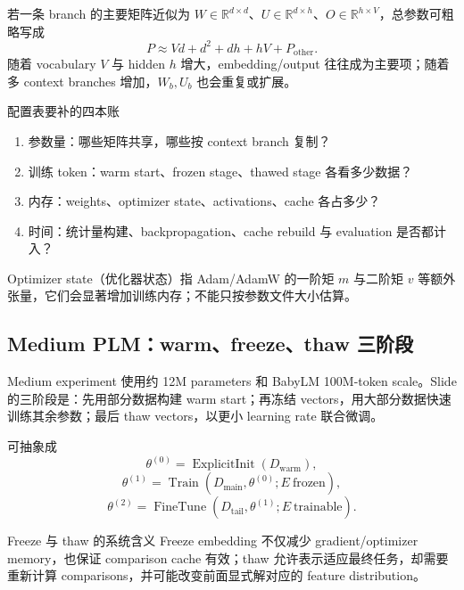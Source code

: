 
若一条 branch 的主要矩阵近似为 $W\in\mathbb{R}^{d\times d}$、$U\in\mathbb{R}^{d\times h}$、$O\in\mathbb{R}^{h\times V}$，总参数可粗略写成
\[
P\approx Vd+d^2+dh+hV+P_{\text{other}}.
\]
随着 vocabulary $V$ 与 hidden $h$ 增大，embedding/output 往往成为主要项；随着多 context branches 增加，$W_b,U_b$ 也会重复或扩展。

\begin{knowledgebox}{配置表要补的四本账}
\begin{enumerate}
  \item 参数量：哪些矩阵共享，哪些按 context branch 复制？
  \item 训练 token：warm start、frozen stage、thawed stage 各看多少数据？
  \item 内存：weights、optimizer state、activations、cache 各占多少？
  \item 时间：统计量构建、backpropagation、cache rebuild 与 evaluation 是否都计入？
\end{enumerate}
Optimizer state（优化器状态）指 Adam/AdamW 的一阶矩 $m$ 与二阶矩 $v$ 等额外张量，它们会显著增加训练内存；不能只按参数文件大小估算。
\end{knowledgebox}

\subsection{Medium PLM：warm、freeze、thaw 三阶段}

Medium experiment 使用约 12M parameters 和 BabyLM 100M-token scale。Slide 的三阶段是：先用部分数据构建 warm start；再冻结 vectors，用大部分数据快速训练其余参数；最后 thaw vectors，以更小 learning rate 联合微调。


可抽象成
\[
\theta^{(0)}=\operatorname{ExplicitInit}(D_{\text{warm}}),
\]
\[
\theta^{(1)}=\operatorname{Train}(D_{\text{main}},\theta^{(0)};E\ \text{frozen}),
\]
\[
\theta^{(2)}=\operatorname{FineTune}(D_{\text{tail}},\theta^{(1)};E\ \text{trainable}).
\]

\begin{importantbox}{Freeze 与 thaw 的系统含义}
Freeze embedding 不仅减少 gradient/optimizer memory，也保证 comparison cache 有效；thaw 允许表示适应最终任务，却需要重新计算 comparisons，并可能改变前面显式解对应的 feature distribution。
\end{importantbox}

